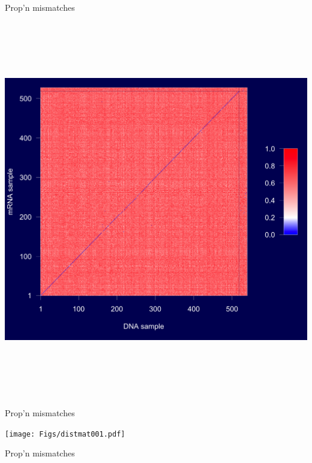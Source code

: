 \documentclass[12pt]{article}
\newcommand{\headsize}{\fontsize{35}{35} \selectfont}
\begin{document}
\newpage

\headsize \color{myyellow}
\hfill \begin{minipage}{5.75in}
\centering
Prop'n mismatches
\end{minipage}

\vfill

\centerline{\includegraphics[height=6.5in]{Figs/distmatall.png}}

\newpage



\headsize \color{myyellow}
\hfill \begin{minipage}{5.75in}
\centering
Prop'n mismatches
\end{minipage}

\vfill

\centerline{\texttt{[image: Figs/distmat001.pdf]}}

\newpage




\headsize \color{myyellow}
\hfill \begin{minipage}{5.75in}
\centering
Prop'n mismatches
\end{minipage}
\end{document}
